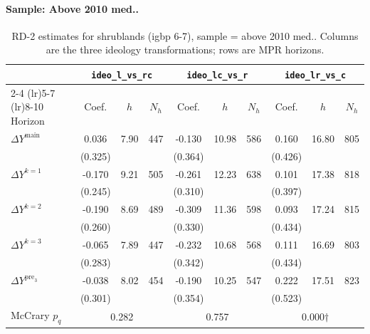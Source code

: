 \documentclass[11pt]{article}
\begin{document}
\paragraph{Sample: Above 2010 med..}
\begin{table}[H]
\centering
\scriptsize
\caption{RD-2 estimates for shrublands (igbp 6-7), sample = above 2010 med..
Columns are the three ideology transformations; rows are MPR horizons.}
\label{tab:rd2_shrublands_above}
\begin{tabular}{l ccc ccc ccc}
\toprule
 & \multicolumn{3}{c}{\texttt{ideo\_l\_vs\_rc}}
 & \multicolumn{3}{c}{\texttt{ideo\_lc\_vs\_r}}
 & \multicolumn{3}{c}{\texttt{ideo\_lr\_vs\_c}} \\
\cmidrule(lr){2-4} \cmidrule(lr){5-7} \cmidrule(lr){8-10}
Horizon & Coef. & $h$ & $N_h$ & Coef. & $h$ & $N_h$ & Coef. & $h$ & $N_h$ \\
\midrule
$\Delta Y^{\text{main}}$ & 0.036 & 7.90 & 447 & -0.130 & 10.98 & 586 & 0.160 & 16.80 & 805 \\
 & (0.325) &  &  & (0.364) &  &  & (0.426) &  &  \\
\addlinespace[1pt]
$\Delta Y^{k=1}$ & -0.170 & 9.21 & 505 & -0.261 & 12.23 & 638 & 0.101 & 17.38 & 818 \\
 & (0.245) &  &  & (0.310) &  &  & (0.397) &  &  \\
\addlinespace[1pt]
$\Delta Y^{k=2}$ & -0.190 & 8.69 & 489 & -0.309 & 11.36 & 598 & 0.093 & 17.24 & 815 \\
 & (0.260) &  &  & (0.330) &  &  & (0.434) &  &  \\
\addlinespace[1pt]
$\Delta Y^{k=3}$ & -0.065 & 7.89 & 447 & -0.232 & 10.68 & 568 & 0.111 & 16.69 & 803 \\
 & (0.283) &  &  & (0.342) &  &  & (0.434) &  &  \\
\addlinespace[1pt]
$\Delta Y^{\text{pre}_3}$ & -0.038 & 8.02 & 454 & -0.190 & 10.25 & 547 & 0.222 & 17.51 & 823 \\
 & (0.301) &  &  & (0.354) &  &  & (0.523) &  &  \\
\addlinespace[1pt]
\midrule
McCrary $p_q$ & \multicolumn{3}{c}{0.282} & \multicolumn{3}{c}{0.757} & \multicolumn{3}{c}{0.000$\dagger$} \\
\bottomrule
\end{tabular}
\end{table}
\end{document}
